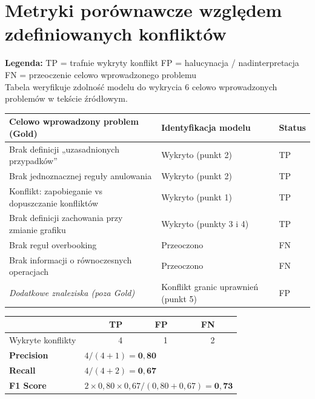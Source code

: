 \documentclass[12pt,a4paper]{article}
\newcommand{\tp}[1]{\colorbox{tpcolor}{\small #1}}
\newcommand{\fp}[1]{\colorbox{fpcolor}{\small #1}}
\newcommand{\fn}[1]{\colorbox{fncolor}{\small #1}}
\begin{document}
\newpage

\section{Metryki porównawcze względem zdefiniowanych konfliktów}

\begin{mdframed}[backgroundcolor=metabg, linewidth=0pt, innerleftmargin=10pt, innerrightmargin=10pt, innertopmargin=8pt, innerbottommargin=8pt]
\small
\textbf{Legenda:} \tp{TP} = trafnie wykryty konflikt \quad \fp{FP} = halucynacja / nadinterpretacja \quad \fn{FN} = przeoczenie celowo wprowadzonego problemu\\[0.3em]
Tabela weryfikuje zdolność modelu do wykrycia 6 celowo wprowadzonych problemów w tekście źródłowym.
\end{mdframed}

\vspace{0.8em}

\begin{tabular}{p{7cm} p{6cm} l}
\toprule
\textbf{Celowo wprowadzony problem (Gold)} & \textbf{Identyfikacja modelu} & \textbf{Status} \\
\midrule
Brak definicji „uzasadnionych przypadków” & Wykryto (punkt 2) & \tp{TP} \\
Brak jednoznacznej reguły anulowania & Wykryto (punkt 2) & \tp{TP} \\
Konflikt: zapobieganie vs dopuszczanie konfliktów & Wykryto (punkt 1) & \tp{TP} \\
Brak definicji zachowania przy zmianie grafiku & Wykryto (punkty 3 i 4) & \tp{TP} \\
Brak reguł overbooking & Przeoczono & \fn{FN} \\
Brak informacji o równoczesnych operacjach & Przeoczono & \fn{FN} \\
\midrule
\textit{Dodatkowe znaleziska (poza Gold)} & Konflikt granic uprawnień (punkt 5) & \fp{FP} \\
\bottomrule
\end{tabular}

\vspace{1em}
\begin{tabular}{lrrrr}
\toprule
& \textbf{TP} & \textbf{FP} & \textbf{FN} & \\
\midrule
Wykryte konflikty & 4 & 1 & 2 & \\
\midrule
\textbf{Precision} & \multicolumn{4}{l}{$4 / (4+1) = \mathbf{0{,}80}$} \\
\textbf{Recall}    & \multicolumn{4}{l}{$4 / (4+2) = \mathbf{0{,}67}$} \\
\textbf{F1 Score}  & \multicolumn{4}{l}{$2 \times 0{,}80 \times 0{,}67 / (0{,}80+0{,}67) = \mathbf{0{,}73}$} \\
\bottomrule
\end{tabular}
\end{document}
